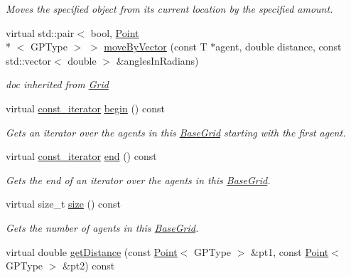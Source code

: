 \begin{DoxyCompactItemize}
\begin{DoxyCompactList}\small\item\em Moves the specified object from its current location by the specified amount. \end{DoxyCompactList}\item 
\hypertarget{classrepast_1_1_base_grid_a14de646e4c01d6bcd0356669a23af43d}{virtual std\-::pair$<$ bool, \hyperlink{classrepast_1_1_point}{Point}\\*
$<$ G\-P\-Type $>$ $>$ \hyperlink{classrepast_1_1_base_grid_a14de646e4c01d6bcd0356669a23af43d}{move\-By\-Vector} (const T $\ast$agent, double distance, const std\-::vector$<$ double $>$ \&angles\-In\-Radians)}\label{classrepast_1_1_base_grid_a14de646e4c01d6bcd0356669a23af43d}

\begin{DoxyCompactList}\small\item\em doc inherited from \hyperlink{classrepast_1_1_grid}{Grid} \end{DoxyCompactList}\item 
virtual \hyperlink{classrepast_1_1_base_grid_ae4de9c96ae3ee3d7021a1e5b3c61b9a6}{const\-\_\-iterator} \hyperlink{classrepast_1_1_base_grid_ab5aa5a65509879b528bac5b3a9f544b9}{begin} () const 
\begin{DoxyCompactList}\small\item\em Gets an iterator over the agents in this \hyperlink{classrepast_1_1_base_grid}{Base\-Grid} starting with the first agent. \end{DoxyCompactList}\item 
virtual \hyperlink{classrepast_1_1_base_grid_ae4de9c96ae3ee3d7021a1e5b3c61b9a6}{const\-\_\-iterator} \hyperlink{classrepast_1_1_base_grid_ac7eced6c979ccf417b4bbc1c064c687d}{end} () const 
\begin{DoxyCompactList}\small\item\em Gets the end of an iterator over the agents in this \hyperlink{classrepast_1_1_base_grid}{Base\-Grid}. \end{DoxyCompactList}\item 
virtual size\-\_\-t \hyperlink{classrepast_1_1_base_grid_ab1e81ffc9b8f581279a89abf1a4e62e1}{size} () const 
\begin{DoxyCompactList}\small\item\em Gets the number of agents in this \hyperlink{classrepast_1_1_base_grid}{Base\-Grid}. \end{DoxyCompactList}\item 
virtual double \hyperlink{classrepast_1_1_base_grid_a124b5f53a5e96e9ed8e59534e9417f42}{get\-Distance} (const \hyperlink{classrepast_1_1_point}{Point}$<$ G\-P\-Type $>$ \&pt1, const \hyperlink{classrepast_1_1_point}{Point}$<$ G\-P\-Type $>$ \&pt2) const 

\end{DoxyCompactItemize}

